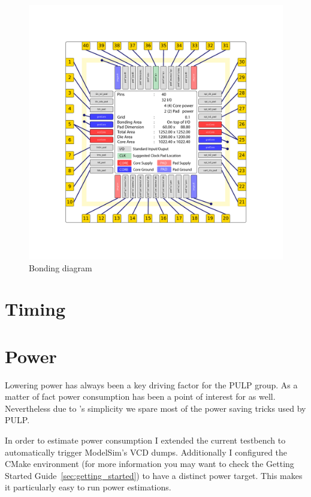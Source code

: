 \begin{figure}[tb]
  \centering
  \includegraphics[width=\linewidth]{./figures/pad_instaces_img_ord}
  \caption{Bonding diagram}
  \label{fig:bonding_diagram}
\end{figure}

\section{Timing}


\section{Power}


Lowering power has always been a key driving factor for the PULP group. As a matter of fact power consumption has been a point of interest for \pulpino as well. Nevertheless due to \pulpino's simplicity we spare most of the power saving tricks used by PULP. 

In order to estimate power consumption I extended the current testbench to automatically trigger ModelSim's VCD dumps. Additionally I configured the CMake environment (for more information you may want to check the Getting Started Guide~\ref{sec:getting_started}) to have a distinct power target. This makes it particularly easy to run power estimations.

